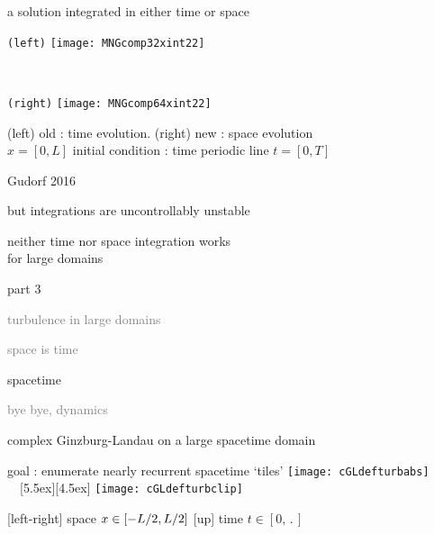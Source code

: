 \begin{frame}{a solution integrated in either time or space}
\begin{center}
  \begin{minipage}[height=.40\textheight]{.35\textwidth}
    \centering \small{\texttt{(left)}}
    \texttt{[image: MNGcomp32xint22]}
  \end{minipage}
~~~~~~~~~
  \begin{minipage}[height=.40\textheight]{.35\textwidth}
    \centering \small{\texttt{(right)}}
    \texttt{[image: MNGcomp64xint22]}
  \end{minipage}
\end{center}
    (left) old : time evolution. (right) new : space evolution
    \\
    $x=[0,L]$ %
       initial condition : time periodic line $t = [0,T]$

\vfill\hfill        Gudorf 2016
\end{frame}

\begin{frame}{but integrations are uncontrollably unstable}
\begin{center}
{\huge neither} time {\huge nor} space integration {\huge works} \\
for large domains
\end{center}

\vfill
\color{red}{rethink the formulation!}
\end{frame}

\begin{frame}{part 3}
\begin{enumerate}
              \item
    \textcolor{gray}{\small
turbulence in large domains
              \item
space is time
    }
              \item {\Large
spacetime
    }\textcolor{gray}{\small
              \item
bye bye, dynamics
                    }
            \end{enumerate}
\end{frame}

\begin{frame}{complex Ginzburg-Landau on a large spacetime domain}
\begin{block}{goal : enumerate nearly recurrent spacetime `tiles'}
  \texttt{[image: cGLdefturbabs]}%
~~\raisebox{+3.33ex}[5.5ex][4.5ex]
		 {\texttt{[image: cGLdefturbclip]}}
\end{block}

{\footnotesize
[left-right] space $x \in [-L/2,L/2]$
\qquad
{[up]} time $t\in [0,\period{}]$
}
\end{frame}

